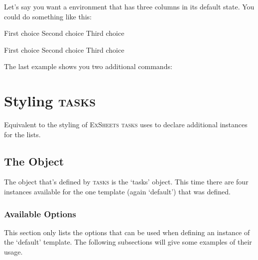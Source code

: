 \documentclass[DIV9,toc=index,toc=bib,numbers=noendperiod]{cnpkgdoc}
\newcommand*\Tasks{{\scshape\textcolor{main}{tasks}}\xspace}
\newcommand*\ExSheets{{\scshape\textcolor{main}{ExSheets}}\xspace}
\newcommand*\correct{\PrintSolutionsTF{\checkedchoicebox}{\choicebox}}
\begin{document}
Let's say you want a  environment that has three columns in its
default state.  You could do something like this:
\begin{beispiel}
 \begin{question}
 \begin{choices}
  \choice First choice
  \choice Second choice
  \choice[\correct] Third choice
 \end{choices}
 \end{question}
 \begin{solution}[print]
 \begin{choices}
  \choice First choice
  \choice Second choice
  \choice[\correct] Third choice
 \end{choices}
 \end{solution}
\end{beispiel}

The last example shows you two additional commands:
\begin{beschreibung}
  \choicebox
  \checkedchoicebox
\end{beschreibung}

\section{Styling \Tasks}
Equivalent to the styling of \ExSheets{} \Tasks uses  to
declare additional instances for the lists.

\subsection{The  Object}\label{sec:tasks}
The object that's defined by \Tasks is the `tasks' object.  This time there
are four instances available for the one template (again `default') that was
defined.

\subsubsection{Available Options}
This section only lists the options that can be used when defining an instance
of the `default' template.  The following subsections will give some examples
of their usage.
\end{document}
